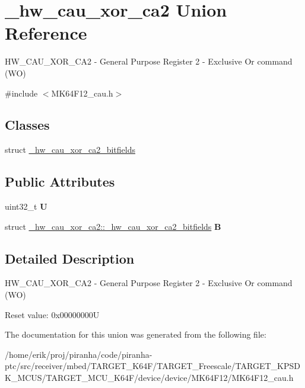 \hypertarget{union__hw__cau__xor__ca2}{}\section{\+\_\+hw\+\_\+cau\+\_\+xor\+\_\+ca2 Union Reference}
\label{union__hw__cau__xor__ca2}


H\+W\+\_\+\+C\+A\+U\+\_\+\+X\+O\+R\+\_\+\+C\+A2 -\/ General Purpose Register 2 -\/ Exclusive Or command (WO)  




{\ttfamily \#include $<$M\+K64\+F12\+\_\+cau.\+h$>$}

\subsection*{Classes}
\begin{DoxyCompactItemize}
\item 
struct \hyperlink{struct__hw__cau__xor__ca2_1_1__hw__cau__xor__ca2__bitfields}{\+\_\+hw\+\_\+cau\+\_\+xor\+\_\+ca2\+\_\+bitfields}
\end{DoxyCompactItemize}
\subsection*{Public Attributes}
\begin{DoxyCompactItemize}
\item 
uint32\+\_\+t {\bfseries U}\hypertarget{union__hw__cau__xor__ca2_a51bde6f43852ff054e1426bf1ab03be7}{}\label{union__hw__cau__xor__ca2_a51bde6f43852ff054e1426bf1ab03be7}

\item 
struct \hyperlink{struct__hw__cau__xor__ca2_1_1__hw__cau__xor__ca2__bitfields}{\+\_\+hw\+\_\+cau\+\_\+xor\+\_\+ca2\+::\+\_\+hw\+\_\+cau\+\_\+xor\+\_\+ca2\+\_\+bitfields} {\bfseries B}\hypertarget{union__hw__cau__xor__ca2_a2b69a22bae2731a62b53b102f66aa9da}{}\label{union__hw__cau__xor__ca2_a2b69a22bae2731a62b53b102f66aa9da}

\end{DoxyCompactItemize}


\subsection{Detailed Description}
H\+W\+\_\+\+C\+A\+U\+\_\+\+X\+O\+R\+\_\+\+C\+A2 -\/ General Purpose Register 2 -\/ Exclusive Or command (WO) 

Reset value\+: 0x00000000U 

The documentation for this union was generated from the following file\+:\begin{DoxyCompactItemize}
\item 
/home/erik/proj/piranha/code/piranha-\/ptc/src/receiver/mbed/\+T\+A\+R\+G\+E\+T\+\_\+\+K64\+F/\+T\+A\+R\+G\+E\+T\+\_\+\+Freescale/\+T\+A\+R\+G\+E\+T\+\_\+\+K\+P\+S\+D\+K\+\_\+\+M\+C\+U\+S/\+T\+A\+R\+G\+E\+T\+\_\+\+M\+C\+U\+\_\+\+K64\+F/device/device/\+M\+K64\+F12/M\+K64\+F12\+\_\+cau.\+h\end{DoxyCompactItemize}
